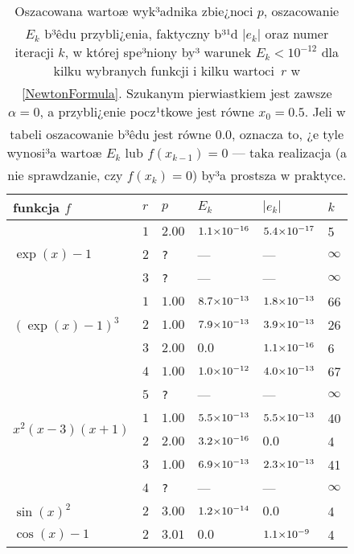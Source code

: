\documentclass[a4paper,12pt]{article}
\newcommand{\razy}{\hspace{-0.5ex}\times\hspace{-0.5ex}}
\begin{document}
\begin{table}[!h]\vspace*{-2ex}
\caption{\footnotesize Oszacowana wartoæ wyk³adnika zbie¿noci $p$, oszacowanie $E_k$
b³êdu przybli¿enia, faktyczny b³¹d $|e_k|$ oraz numer iteracji $k$, w której spe³niony
by³ warunek $E_k < 10^{-12}$ dla kilku wybranych funkcji i kilku wartoci~$r$
w \eqref{NewtonFormula}. Szukanym pierwiastkiem jest zawsze $\alpha = 0$,
a przybli¿enie pocz¹tkowe jest równe $x_0 = 0.5$. Jeli w tabeli oszacowanie
b³êdu jest równe $0.0$, oznacza to, ¿e tyle wynosi³a wartoæ $E_k$ lub
$f(x_{k-1})=0$ --- taka realizacja (a nie sprawdzanie, czy $f(x_k)=0$)
by³a prostsza w praktyce.}\vspace{-1.5ex}
\label{T1} %
\begin{center}
\begin{small}
\begin{tabular}{|C{20ex}|C{10ex}|C{10ex}|C{10ex}|C{10ex}|C{10ex}|}\hline
funkcja $f$ & $r$ & $p$ & $E_k$ & $|e_k|$ & $k$\\\hline
{}
& $1$ & $2.00$ & $1.1\razy10^{-16}$ & $5.4\razy10^{-17}$ & 5 \\
& $2$ & \verb;?; & --- & --- & $\infty$ \\
& $3$ & \verb;?; & --- & --- & $\infty$ \\\hline
{}
& $1$ & $1.00$ & $8.7\razy10^{-13}$ & $1.8\razy10^{-13}$ & 66 \\
& $2$ & $1.00$ & $7.9\razy10^{-13}$ & $3.9\razy10^{-13}$ & 26 \\
& $3$ & $2.00$ & $0.0$ & $1.1\razy10^{-16}$ & 6 \\
& $4$ & $1.00$ & $1.0\razy10^{-12}$ & $4.0\razy10^{-13}$ & 67 \\
& $5$ & \verb;?; & --- & --- & $\infty$ \\\hline
{}
& $1$ & $1.00$ & $5.5\razy10^{-13}$ & $5.5\razy10^{-13}$ & 40 \\
& $2$ & $2.00$ & $3.2\razy10^{-16}$ & $0.0$ & 4 \\
& $3$ & $1.00$ & $6.9\razy10^{-13}$ & $2.3\razy10^{-13}$ & 41 \\
& $4$ & \verb;?; & --- & --- & $\infty$ \\\hline
{}
& $2$ & $3.00$ & $1.2\razy10^{-14}$ & $0.0$ & 4 \\\hline
{}
& $2$ & $3.01$ & $0.0$ & $1.1\razy10^{-9}$ & 4 \\\hline
\end{tabular}
\end{small}
\end{center}
\end{table}\vspace{-3ex}
\end{document}
